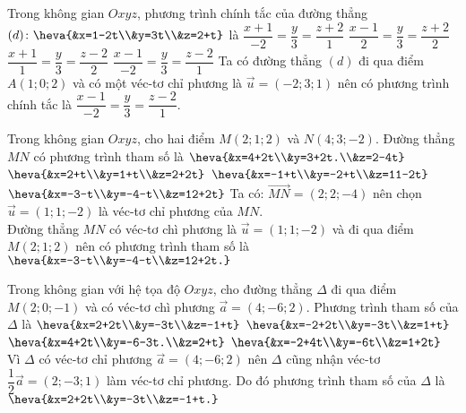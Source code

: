 \begin{ex}%
	Trong không gian $O x y z$, phương trình chính tắc của đường thẳng $(d)\colon\heva{&x=1-2t\\&y=3t\\&z=2+t}$ là 
		\choice 
		{$\dfrac{x+1}{-2}=\dfrac{y}{3}=\dfrac{z+2}{1}$}
		{$\dfrac{x-1}{2}=\dfrac{y}{3}=\dfrac{z+2}{2}$}
		{$\dfrac{x+1}{1}=\dfrac{y}{3}=\dfrac{z-2}{2}$}
		{\True $\dfrac{x-1}{-2}=\dfrac{y}{3}=\dfrac{z-2}{1}$}
		\loigiai 
		{
	Ta có đường thẳng $(d)$ đi qua điểm $A(1;0;2)$ và có một véc-tơ chỉ phương là $\vec{u}=(-2;3;1)$ nên có phương trình chính tắc là $\dfrac{x-1}{-2}=\dfrac{y}{3}=\dfrac{z-2}{1}$.
		}
	\end{ex}

\begin{ex}%
	Trong không gian $O x y z$, cho hai điểm $M(2;1;2)$ và $N(4;3;-2)$. Đường thẳng $MN$ có phương trình tham số là 
	\choice 
	{$\heva{&x=4+2t\\&y=3+2t.\\&z=2-4t}$}
		{$\heva{&x=2+t\\&y=1+t\\&z=2+2t}$}
			{$\heva{&x=-1+t\\&y=-2+t\\&z=11-2t}$}
				{\True $\heva{&x=-3-t\\&y=-4-t\\&z=12+2t}$}
					\loigiai 
					{
	Ta có: $\vec{MN}=(2;2;-4)$ nên chọn $\vec{u}=(1;1;-2)$ là véc-tơ chỉ phương của $MN$.\\
	Đường thẳng $MN$ có véc-tơ chì phương là $\vec{u}=(1;1;-2)$ và đi qua điểm $M(2;1;2)$ nên có phương trình tham số là $\heva{&x=-3-t\\&y=-4-t\\&z=12+2t.}$
					}
				\end{ex}
	
\begin{ex}%
	Trong không gian với hệ tọa độ $O x y z$, cho đường thẳng $\Delta$ đi qua điểm $M(2;0;-1)$ và có véc-tơ chì phương $\vec{a}=(4;-6;2)$. Phương trình tham số của $\Delta$ là 
	\choice 
	{\True $\heva{&x=2+2t\\&y=-3t\\&z=-1+t}$}
		{$\heva{&x=-2+2t\\&y=-3t\\&z=1+t}$}
			{$\heva{&x=4+2t\\&y=-6-3t.\\&z=2+t}$}
				{$\heva{&x=-2+4t\\&y=-6t\\&z=1+2t}$}
					\loigiai 
					{
Vì $\Delta$ có véc-tơ chỉ phương $\vec{a}=(4;-6;2)$ nên $\Delta$ cũng nhận véc-tơ $\dfrac{1}{2}\vec{a}=(2;-3;1)$ làm véc-tơ chỉ phương. Do đó phương trình tham số của $\Delta$ là $\heva{&x=2+2t\\&y=-3t\\&z=-1+t.}$
					}
\end{ex}

